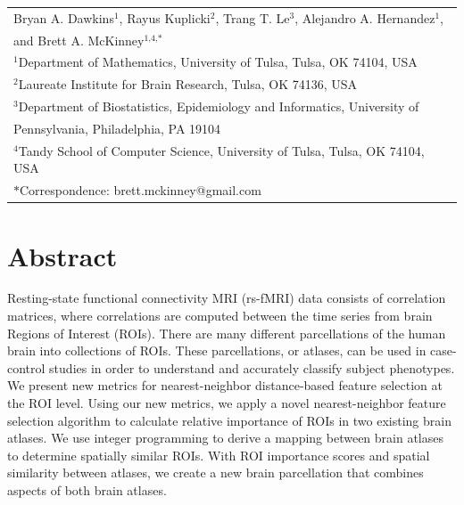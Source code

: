 \documentclass[10pt,letterpaper]{article}\usepackage[]{graphicx}\usepackage[]{color}
\begin{document}
\vspace*{0.2in}

{\Large
\textbf{} %
}
\begin{center}
  \begin{tabular}{l}
  Bryan A. Dawkins$^{\text{1}}$, Rayus Kuplicki$^{\text{2}}$, Trang T. Le$^{\text{3}}$, Alejandro A. Hernandez$^{\text{1}}$, \\
  and Brett A. McKinney$^{\text{1,4,}*}$ \\
  $^{\text{1}}$Department of Mathematics, University of Tulsa, Tulsa, OK 74104, USA \\
  $^{\text{2}}$Laureate Institute for Brain Research, Tulsa, OK 74136, USA \\
  $^{\text{3}}$Department of Biostatistics, Epidemiology and Informatics, University of \\
  \hphantom{2}Pennsylvania, Philadelphia, PA 19104 \\
  $^{\text{4}}$Tandy School of Computer Science, University of Tulsa, Tulsa, OK 74104, USA\\
  $*$Correspondence: brett.mckinney@gmail.com
  \end{tabular}
\end{center}


\section*{Abstract}
Resting-state functional connectivity MRI (rs-fMRI) data consists of correlation matrices, where correlations are computed between the time series from brain Regions of Interest (ROIs). There are many different parcellations of the human brain into collections of ROIs. These parcellations, or atlases, can be used in case-control studies in order to understand and accurately classify subject phenotypes. We present new metrics for nearest-neighbor distance-based feature selection at the ROI level. Using our new metrics, we apply a novel nearest-neighbor feature selection algorithm to calculate relative importance of ROIs in two existing brain atlases. We use integer programming to derive a mapping between brain atlases to determine spatially similar ROIs. With ROI importance scores and spatial similarity between atlases, we create a new brain parcellation that combines aspects of both brain atlases.
\linenumbers
\end{document}
